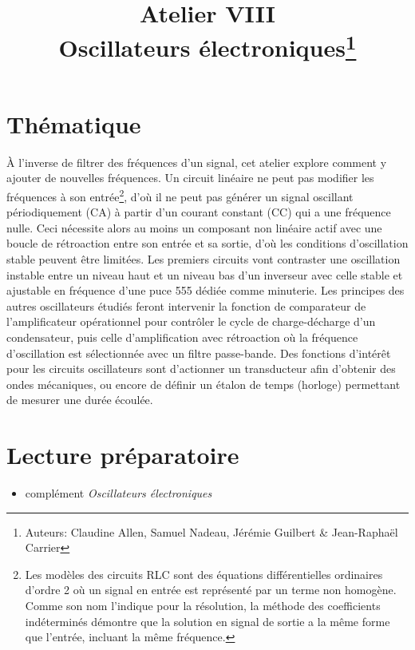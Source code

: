 \documentclass[canadien,12pt,oneside,letterpaper]{article}
\title{\textbf{Atelier VIII}\\Oscillateurs électroniques\thanks{Auteurs: Claudine Allen, Samuel Nadeau, Jérémie Guilbert \& Jean-Raphaël Carrier}}
\date{}
\begin{document}
\maketitle \vspace{-2.5cm}

\section{Thématique}\label{sec:objectifs}
À l’inverse de filtrer des fréquences d’un signal, cet atelier explore comment y ajouter de nouvelles fréquences. Un circuit linéaire ne peut pas modifier les fréquences à son entrée\footnote{Les modèles des circuits RLC sont des équations différentielles ordinaires d'ordre 2 où un signal en entrée est représenté par un terme non homogène. Comme son nom l'indique pour la résolution, la méthode des coefficients indéterminés démontre que la solution en signal de sortie a la même forme que l'entrée, incluant la même fréquence.}, d'où il ne peut pas générer un signal oscillant périodiquement (CA) à partir d’un courant constant (CC) qui a une fréquence nulle. Ceci nécessite alors au moins un composant non linéaire actif avec une boucle de rétroaction entre son entrée et sa sortie, d'où les conditions d'oscillation stable peuvent être limitées. Les premiers circuits vont contraster une oscillation instable entre un niveau haut et un niveau bas d'un inverseur avec celle stable et ajustable en fréquence d'une puce 555 dédiée comme minuterie. Les principes des autres oscillateurs étudiés feront intervenir la fonction de comparateur de l’amplificateur opérationnel pour contrôler le cycle de charge-décharge d’un condensateur, puis celle d’amplification avec rétroaction où la fréquence d’oscillation est sélectionnée avec un filtre passe-bande. Des fonctions d’intérêt pour les circuits oscillateurs sont d’actionner un transducteur afin d’obtenir des ondes mécaniques, ou encore de définir un étalon de temps (horloge) permettant de mesurer une durée écoulée. %



\section{Lecture préparatoire}
\vspace{-1ex}
\begin{itemize}
\item complément \textit{Oscillateurs électroniques}
\end{itemize}
\end{document}
